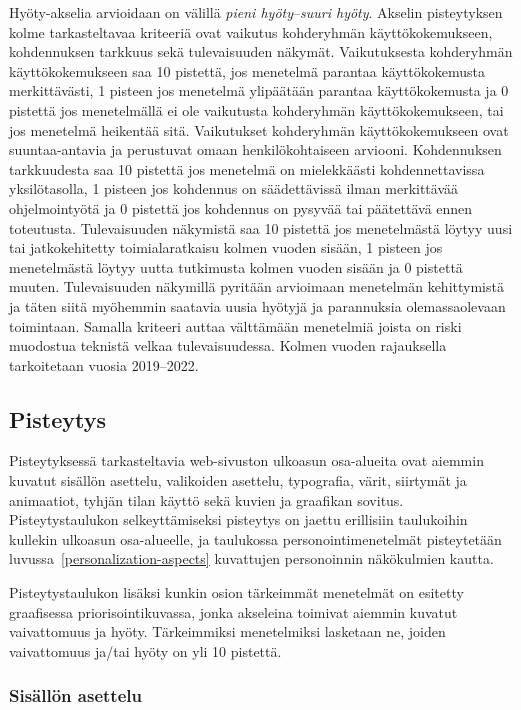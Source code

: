 \documentclass[finnish, 12pt, a4paper, elec, utf8, a-1b, online]{aaltothesis}
\begin{document}
Hyöty-akselia arvioidaan on välillä \textit{pieni hyöty}--\textit{suuri hyöty}.
Akselin pisteytyksen kolme tarkasteltavaa kriteeriä ovat vaikutus kohderyhmän
käyttökokemukseen, kohdennuksen tarkkuus sekä tulevaisuuden näkymät.
Vaikutuksesta kohderyhmän käyttökokemukseen saa 10 pistettä, jos menetelmä
parantaa käyttökokemusta merkittävästi, 1 pisteen jos menetelmä ylipäätään
parantaa käyttökokemusta ja 0 pistettä jos menetelmällä ei ole vaikutusta
kohderyhmän käyttökokemukseen, tai jos menetelmä heikentää sitä. Vaikutukset
kohderyhmän käyttökokemukseen ovat suuntaa-antavia ja perustuvat omaan
henkilökohtaiseen arviooni. Kohdennuksen tarkkuudesta saa 10 pistettä jos
menetelmä on mielekkäästi kohdennettavissa yksilötasolla, 1 pisteen jos
kohdennus on säädettävissä ilman merkittävää ohjelmointyötä ja 0 pistettä jos
kohdennus on pysyvää tai päätettävä ennen toteutusta. Tulevaisuuden näkymistä
saa 10 pistettä jos menetelmästä löytyy uusi tai jatkokehitetty toimialaratkaisu
kolmen vuoden sisään, 1 pisteen jos menetelmästä löytyy uutta tutkimusta kolmen
vuoden sisään ja 0 pistettä muuten. Tulevaisuuden näkymillä pyritään arvioimaan
menetelmän kehittymistä ja täten siitä myöhemmin saatavia uusia hyötyjä ja
parannuksia olemassaolevaan toimintaan. Samalla kriteeri auttaa välttämään
menetelmiä joista on riski muodostua teknistä velkaa tulevaisuudessa. Kolmen
vuoden rajauksella tarkoitetaan vuosia 2019--2022.

\subsection{Pisteytys}

Pisteytyksessä tarkasteltavia web-sivuston ulkoasun osa-alueita ovat aiemmin
kuvatut sisällön asettelu, valikoiden asettelu, typografia, värit, siirtymät ja
animaatiot, tyhjän tilan käyttö sekä kuvien ja graafikan sovitus.
Pisteytystaulukon selkeyttämiseksi pisteytys on jaettu erillisiin taulukoihin
kullekin ulkoasun osa-alueelle, ja taulukossa personointimenetelmät pisteytetään
luvussa~\ref{personalization-aspects} kuvattujen personoinnin näkökulmien
kautta.

Pisteytystaulukon lisäksi kunkin osion tärkeimmät menetelmät on esitetty
graafisessa priorisointikuvassa, jonka akseleina toimivat aiemmin kuvatut
vaivattomuus ja hyöty. Tärkeimmiksi menetelmiksi lasketaan ne, joiden
vaivattomuus ja/tai hyöty on yli 10 pistettä.

\subsubsection{Sisällön asettelu}
\end{document}
